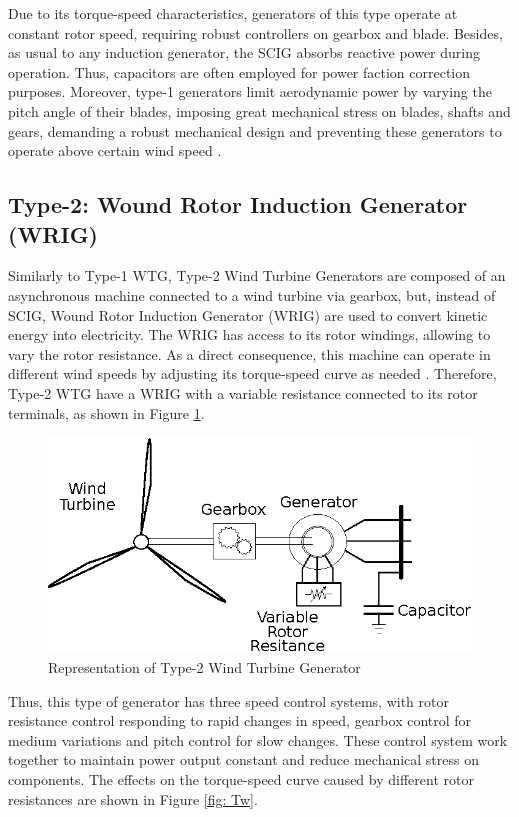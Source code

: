 Due to its torque-speed characteristics, generators of this type operate at constant rotor speed, requiring robust controllers on gearbox and blade. Besides, as usual to any induction generator, the SCIG absorbs reactive power during operation. Thus, capacitors are often employed for power faction correction purposes. Moreover, type-1 generators limit aerodynamic power by varying the pitch angle of their blades, imposing great mechanical stress on blades, shafts and gears, demanding a robust mechanical design and preventing these generators to operate above certain wind speed \cite{Ellis2011}. 

\subsection{Type-2: Wound Rotor Induction Generator (WRIG)}

Similarly to Type-1 WTG, Type-2 Wind Turbine Generators are composed of an asynchronous machine connected to a wind turbine via gearbox, but, instead of SCIG, Wound Rotor Induction Generator (WRIG) are used to convert kinetic energy into electricity. The WRIG has access to its rotor windings, allowing to vary the rotor resistance. As a direct consequence, this machine can operate in different wind speeds by adjusting its torque-speed curve as needed \cite{Ellis2011}. Therefore, Type-2 WTG have a WRIG with a variable resistance connected to its rotor terminals, as shown in Figure \ref{fig: WTG2}.

\begin{figure}[h]
	\caption{Representation of Type-2 Wind Turbine Generator}
	\begin{center}
		\includegraphics[scale=.8]{Images/Type2WTG.eps}
	\end{center}
	\label{fig: WTG2}
\end{figure}

Thus, this type of generator has three speed control systems, with rotor resistance control responding to rapid changes in speed, gearbox control for medium variations and pitch control for slow changes. These control system work together to maintain power output constant and reduce mechanical stress on components. The effects on the torque-speed curve caused by different rotor resistances are shown in Figure \ref{fig: Tw}.

